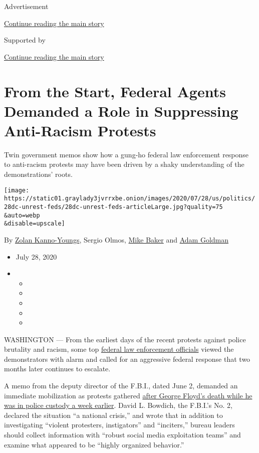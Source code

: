 Advertisement

\protect\hyperlink{after-top}{Continue reading the main story}

Supported by

\protect\hyperlink{after-sponsor}{Continue reading the main story}

\hypertarget{from-the-start-federal-agents-demanded-a-role-in-suppressing-anti-racism-protests}{%
\section{From the Start, Federal Agents Demanded a Role in Suppressing
Anti-Racism
Protests}\label{from-the-start-federal-agents-demanded-a-role-in-suppressing-anti-racism-protests}}

Twin government memos show how a gung-ho federal law enforcement
response to anti-racism protests may have been driven by a shaky
understanding of the demonstrations' roots.

\texttt{[image: https://static01.graylady3jvrrxbe.onion/images/2020/07/28/us/politics/28dc-unrest-feds/28dc-unrest-feds-articleLarge.jpg?quality=75\\\&auto=webp\\\&disable=upscale]}

By \href{https://www.nytimes3xbfgragh.onion/by/zolan-kanno-youngs}{Zolan
Kanno-Youngs}, Sergio Olmos,
\href{https://www.nytimes3xbfgragh.onion/by/mike-baker}{Mike Baker} and
\href{https://www.nytimes3xbfgragh.onion/by/adam-goldman}{Adam Goldman}

\begin{itemize}
\item
  July 28, 2020
\item
  \begin{itemize}
  \item
  \item
  \item
  \item
  \item
  \end{itemize}
\end{itemize}

WASHINGTON --- From the earliest days of the recent protests against
police brutality and racism, some top
\href{https://www.nytimes3xbfgragh.onion/2020/07/30/nyregion/nypd-protester-van.html}{federal
law enforcement officials} viewed the demonstrators with alarm and
called for an aggressive federal response that two months later
continues to escalate.

A memo from the deputy director of the F.B.I., dated June 2, demanded an
immediate mobilization as protests gathered
\href{https://www.nytimes3xbfgragh.onion/2020/05/31/us/george-floyd-investigation.html}{after
George Floyd's death while he was in police custody a week earlier}.
David L. Bowdich, the F.B.I.'s No. 2, declared the situation ``a
national crisis,'' and wrote that in addition to investigating ``violent
protesters, instigators'' and ``inciters,'' bureau leaders should
collect information with ``robust social media exploitation teams'' and
examine what appeared to be ``highly organized behavior.''

